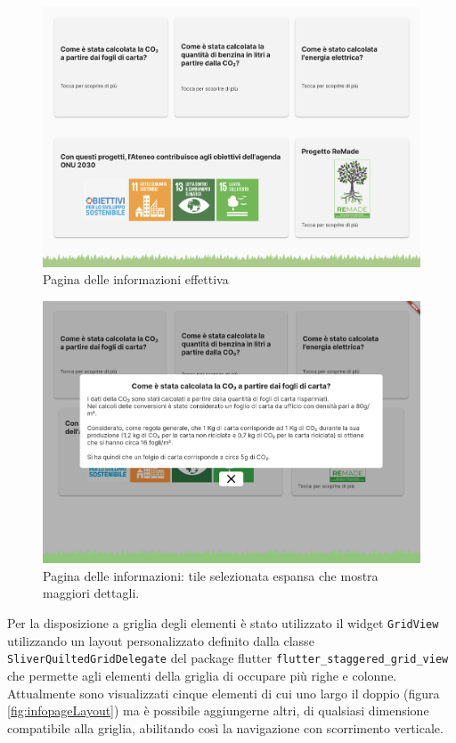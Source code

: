 \begin{figure}
  \centering
  \includegraphics[width=\textwidth]{img/totem/screenshot/infoPageScreen.png}
  \caption{Pagina delle informazioni effettiva}
  \label{fig:infoPage}
\end{figure}
\begin{figure}
  \centering
  \includegraphics[width=\textwidth]{img/totem/screenshot/infoPagePopupScreen.png}
  \caption{Pagina delle informazioni: tile selezionata espansa che mostra maggiori dettagli.}
  \label{fig:infoPagePopup}
\end{figure}

Per la disposizione a griglia degli elementi è stato utilizzato il widget \texttt{GridView} utilizzando un layout personalizzato definito dalla classe \texttt{SliverQuiltedGridDelegate} del package flutter \texttt{flutter\_staggered\_grid\_view} \cite{staggeredGridView} che permette agli elementi della griglia di occupare più righe e colonne.
Attualmente sono visualizzati cinque elementi di cui uno largo il doppio (figura \ref{fig:infopageLayout}) ma è possibile aggiungerne altri, di qualsiasi dimensione compatibile alla griglia, abilitando così la navigazione con scorrimento verticale.

